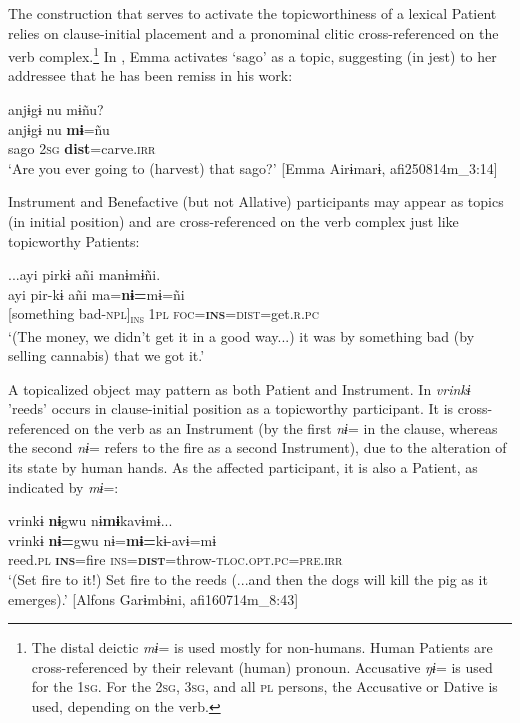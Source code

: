 \documentclass[output=paper]{langscibook}
\begin{document}
 The construction that serves to activate the topicworthiness of a lexical Patient relies on clause-initial placement and a pronominal clitic cross-referenced on the verb complex.\footnote{The distal deictic \textit{mɨ}= is used mostly for non-humans. Human Patients are cross-referenced by their relevant (human) pronoun. Accusative \textit{ŋɨ}= is used for the 1\textsc{sg}. For the \textsc{2sg}, 3\textsc{sg}, and all \textsc{pl} persons, the Accusative or Dative is used, depending on the verb.} In , Emma activates ‘sago’ as a topic, suggesting (in jest) to her addressee that he has been remiss in his work:

\ea\label{ex:brooks:8}
\glll anjɨgɨ  nu   mɨñu?\\
 {anjɨgɨ} nu   \textbf{mɨ}=ñu\\
 {sago} \textsc{2sg} \textbf{\textbf{dist}}{=carve.}\textsc{irr}\\
\glt `Are you ever going to (harvest) that sago?' [Emma Airɨmarɨ, afi250814m\_3:14]
\z


Instrument and Benefactive (but not Allative) participants may appear as topics (in initial position) and are cross-referenced on the verb complex just like topicworthy Patients:

\ea\label{ex:brooks:9}
\glll ...ayi  pirkɨ  añi manɨmɨñi.\\
ayi  pir-kɨ  añi ma=\textbf{nɨ=}mɨ=ñi\\
{}[something  bad-\textsc{npl}]\textsc{\textsubscript{ins}} 1\textsc{pl}  \textsc{foc=}\textbf{\textsc{ins}}=\textsc{dist}=get.\textsc{r.pc}\\
\glt `(The money, we didn’t get it in a good way...) it was by something bad (by selling cannabis) that we got it.' 
\z

A topicalized object may pattern as both Patient and Instrument. In  \textit{vrinkɨ} 'reeds' occurs in clause-initial position as a topicworthy participant. It is cross-referenced on the verb as an Instrument (by the first \textit{nɨ}= in the clause, whereas the second \textit{nɨ}= refers to the fire as a second Instrument), due to the alteration of its state by human hands. As the affected participant, it is also a Patient, as indicated by \textit{mɨ}=:%

\ea\label{ex:brooks:10}
 vrinkɨ  \textbf{nɨ}gwu   nɨ\textbf{mɨ}kavɨmɨ...\\
{ } vrinkɨ  \textbf{nɨ=}gwu  nɨ=\textbf{mɨ=}kɨ-avɨ=mɨ\\
    { } reed.\textsc{pl} \textbf{\textsc{ins}}=fire  \textsc{ins=}\textbf{\textsc{dist}}=throw-\textsc{tloc.opt.pc=pre.irr}\\
\glt `(Set fire to it!) Set fire to the reeds (...and then the dogs will kill the pig as it emerges).' [Alfons Garɨmbɨni, afi160714m\_8:43]
\z
\end{document}
